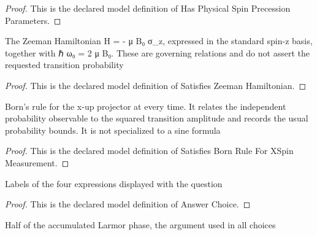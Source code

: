 \begin{proof}
  This is the declared model definition of Has Physical Spin Precession Parameters.
\end{proof}
\begin{definition}
  \label{def:physics:phyx-mini-0543:phyxminiproblems-problemphyxmini0543-satisfieszeemanhamiltonian}
  The Zeeman Hamiltonian H = - μ B₀ σ\_z, expressed in the standard spin-z basis, together with ℏ ω₀ = 2 μ B₀. These are governing relations and do not assert the requested transition probability
\end{definition}
\begin{proof}
  This is the declared model definition of Satisfies Zeeman Hamiltonian.
\end{proof}
\begin{definition}
  \label{def:physics:phyx-mini-0543:phyxminiproblems-problemphyxmini0543-satisfiesbornruleforxspinmeasurement}
  Born's rule for the x-up projector at every time. It relates the independent probability observable to the squared transition amplitude and records the usual probability bounds. It is not specialized to a sine formula
\end{definition}
\begin{proof}
  This is the declared model definition of Satisfies Born Rule For XSpin Measurement.
\end{proof}
\begin{definition}
  \label{def:physics:phyx-mini-0543:phyxminiproblems-problemphyxmini0543-answerchoice}
  Labels of the four expressions displayed with the question
\end{definition}
\begin{proof}
  This is the declared model definition of Answer Choice.
\end{proof}
\begin{definition}
  \label{def:physics:phyx-mini-0543:phyxminiproblems-problemphyxmini0543-halflarmorphase}
  Half of the accumulated Larmor phase, the argument used in all choices
\end{definition}
